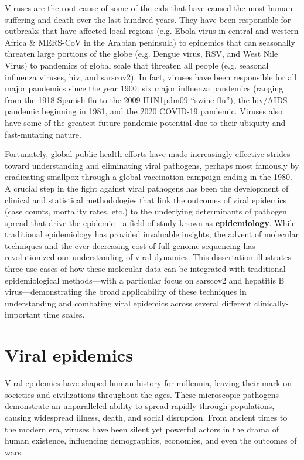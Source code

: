 Viruses are the root cause of some of the \gls{eid}s that have caused the most human suffering and death over the last hundred years.
They have been responsible for outbreaks that have affected local regions (e.g. Ebola virus in central and western Africa \& MERS-CoV in the Arabian peninsula) to epidemics that can seasonally threaten large portions of the globe (e.g. Dengue virus, RSV, and West Nile Virus) to pandemics of global scale that threaten all people (e.g. seasonal influenza viruses, \gls{hiv}, and \gls{sarscov2}).
In fact, viruses have been responsible for all major pandemics since the year 1900: six major influenza pandemics (ranging from the 1918 Spanish flu to the 2009 H1N1pdm09 ``swine flu''), the \gls{hiv}/AIDS pandemic beginning in 1981, and the 2020 COVID-19 pandemic.
Viruses also have some of the greatest future pandemic potential due to their ubiquity and fast-mutating nature.

Fortunately, global public health efforts have made increasingly effective strides toward understanding and eliminating viral pathogens, perhaps most famously by eradicating smallpox through a global vaccination campaign ending in the 1980.
A crucial step in the fight against viral pathogens has been the development of clinical and statistical methodologies that link the outcomes of viral epidemics (case counts, mortality rates, etc.) to the underlying determinants of pathogen spread that drive the epidemic---a field of study known as \textbf{epidemiology}.
While traditional epidemiology has provided invaluable insights, the advent of molecular techniques and the ever decreasing cost of full-genome sequencing has revolutionized our understanding of viral dynamics.
This dissertation illustrates three use cases of how these molecular data can be integrated with traditional epidemiological methods---with a particular focus on \gls{sarscov2} and hepatitis B virus---demonstrating the broad applicability of these techniques in understanding and combating viral epidemics across several different clinically-important time scales.

\section{Viral epidemics}\label{sec:int-viralEpi}
Viral epidemics have shaped human history for millennia, leaving their mark on societies and civilizations throughout the ages.
These microscopic pathogens demonstrate an unparalleled ability to spread rapidly through populations, causing widespread illness, death, and social disruption.
From ancient times to the modern era, viruses have been silent yet powerful actors in the drama of human existence, influencing demographics, economies, and even the outcomes of wars.

